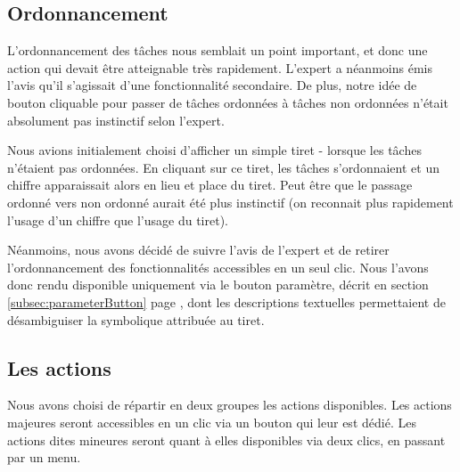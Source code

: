 \documentclass[11pt]{article}
\begin{document}


\subsection{Ordonnancement}

L'ordonnancement des tâches nous semblait un point important, et donc
une action qui devait être atteignable très rapidement. L'expert a
néanmoins émis l'avis qu'il s'agissait d'une fonctionnalité
secondaire. De plus, notre idée de bouton cliquable pour passer de
tâches ordonnées à tâches non ordonnées n'était absolument pas
instinctif selon l'expert.

Nous avions initialement choisi d'afficher un simple tiret - lorsque
les tâches n'étaient pas ordonnées. En cliquant sur ce tiret, les
tâches s'ordonnaient et un chiffre apparaissait alors en lieu et place
du tiret. Peut être que le passage ordonné vers non ordonné aurait été
plus instinctif (on reconnait plus rapidement l'usage d'un chiffre que
l'usage du tiret).

Néanmoins, nous avons décidé de suivre l'avis de l'expert et de
retirer l'ordonnancement des fonctionnalités accessibles en un seul
clic. Nous l'avons donc rendu disponible uniquement via le bouton
paramètre, décrit en section \ref{subsec:parameterButton} page
\pageref{subsec:parameterButton}, dont les descriptions textuelles
permettaient de désambiguiser la symbolique attribuée au tiret.



\subsection{Les actions}

Nous avons choisi de répartir en deux groupes les actions
disponibles. Les actions majeures seront accessibles en un clic via un
bouton qui leur est dédié. Les actions dites mineures seront quant à
elles disponibles via deux clics, en passant par un menu.
\end{document}
